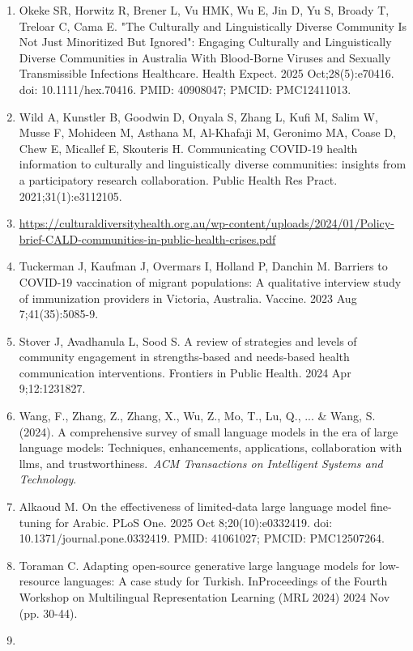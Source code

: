 \documentclass[]{article}
\begin{document}
\begin{enumerate}
  PMC10015358.
\item
  Okeke SR, Horwitz R, Brener L, Vu HMK, Wu E, Jin D, Yu S, Broady T,
  Treloar C, Cama E. "The Culturally and Linguistically Diverse
  Community Is Not Just Minoritized But Ignored": Engaging Culturally
  and Linguistically Diverse Communities in Australia With Blood-Borne
  Viruses and Sexually Transmissible Infections Healthcare. Health
  Expect. 2025 Oct;28(5):e70416. doi: 10.1111/hex.70416. PMID: 40908047;
  PMCID: PMC12411013.
\item
  Wild A, Kunstler B, Goodwin D, Onyala S, Zhang L, Kufi M, Salim W,
  Musse F, Mohideen M, Asthana M, Al-Khafaji M, Geronimo MA, Coase D,
  Chew E, Micallef E, Skouteris H. Communicating COVID-19 health
  information to culturally and linguistically diverse communities:
  insights from a participatory research collaboration. Public Health
  Res Pract. 2021;31(1):e3112105.
\item
  \url{https://culturaldiversityhealth.org.au/wp-content/uploads/2024/01/Policy-brief-CALD-communities-in-public-health-crises.pdf}
\item
  Tuckerman J, Kaufman J, Overmars I, Holland P, Danchin M. Barriers to
  COVID-19 vaccination of migrant populations: A qualitative interview
  study of immunization providers in Victoria, Australia. Vaccine. 2023
  Aug 7;41(35):5085-9.
\item
  Stover J, Avadhanula L, Sood S. A review of strategies and levels of
  community engagement in strengths-based and needs-based health
  communication interventions. Frontiers in Public Health. 2024 Apr
  9;12:1231827.
\item
  Wang, F., Zhang, Z., Zhang, X., Wu, Z., Mo, T., Lu, Q., ... \& Wang,
  S. (2024). A comprehensive survey of small language models in the era
  of large language models: Techniques, enhancements, applications,
  collaboration with llms, and trustworthiness.~\emph{ACM Transactions
  on Intelligent Systems and Technology}.
\item
  Alkaoud M. On the effectiveness of limited-data large language model
  fine-tuning for Arabic. PLoS One. 2025 Oct 8;20(10):e0332419. doi:
  10.1371/journal.pone.0332419. PMID: 41061027; PMCID: PMC12507264.
\item
  Toraman C. Adapting open-source generative large language models for
  low-resource languages: A case study for Turkish. InProceedings of the
  Fourth Workshop on Multilingual Representation Learning (MRL 2024)
  2024 Nov (pp. 30-44).
\item

\end{enumerate}
\end{document}
